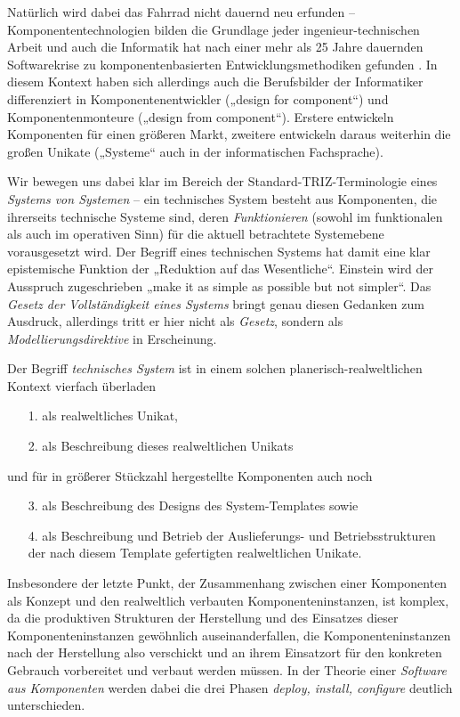 \documentclass[11pt,a4paper]{article}
\begin{document}
Natürlich wird dabei das Fahrrad nicht dauernd neu erfunden --
Komponententechnologien bilden die Grundlage jeder ingenieur-technischen
Arbeit und auch die Informatik hat nach einer mehr als 25 Jahre dauernden
Softwarekrise \cite{Hamilton2008} zu komponentenbasierten
Entwicklungsmethodiken gefunden \cite{Szyperski2002}.  In diesem Kontext haben
sich allerdings auch die Berufsbilder der Informatiker differenziert in
Komponentenentwickler („design for component“) und Komponentenmonteure
(„design from component“).  Erstere entwickeln Komponenten für einen größeren
Markt, zweitere entwickeln daraus weiterhin die großen Unikate („Systeme“ auch
in der informatischen Fachsprache).

Wir bewegen uns dabei klar im Bereich der Standard-TRIZ-Terminologie eines
\emph{Systems von Systemen} -- ein technisches System besteht aus Komponenten,
die ihrerseits technische Systeme sind, deren \emph{Funktionieren} (sowohl im
funktionalen als auch im operativen Sinn) für die aktuell betrachtete
Systemebene vorausgesetzt wird. Der Begriff eines technischen Systems hat
damit eine klar epistemische Funktion der „Reduktion auf das Wesentliche“.
Einstein wird der Ausspruch zugeschrieben „make it as simple as possible but
not simpler“. Das \emph{Gesetz der Vollständigkeit eines Systems} bringt genau
diesen Gedanken zum Ausdruck, allerdings tritt er hier nicht als
\emph{Gesetz}, sondern als \emph{Modellierungsdirektive} in Erscheinung.

Der Begriff \emph{technisches System} ist in einem solchen
planerisch-realweltlichen Kontext vierfach überladen
\begin{itemize}
\item [1.] als realweltliches Unikat,
\item [2.] als Beschreibung dieses realweltlichen Unikats
\end{itemize}
und für in größerer Stückzahl hergestellte Komponenten auch noch
\begin{itemize}
\item [3.] als Beschreibung des Designs des System-Templates sowie
\item [4.] als Beschreibung und Betrieb der Auslieferungs- und
  Betriebsstrukturen der nach diesem Template gefertigten realweltlichen
  Unikate.
\end{itemize}

Insbesondere der letzte Punkt, der Zusammenhang zwischen einer Komponenten als
Konzept und den realweltlich verbauten Komponenteninstanzen, ist komplex, da
die produktiven Strukturen der Herstellung und des Einsatzes dieser
Komponenteninstanzen gewöhnlich auseinanderfallen, die Komponenteninstanzen
nach der Herstellung also verschickt und an ihrem Einsatzort für den konkreten
Gebrauch vorbereitet und verbaut werden müssen. In der Theorie einer
\emph{Software aus Komponenten} werden dabei die drei Phasen \emph{deploy,
  install, configure} deutlich unterschieden. 
\end{document}
